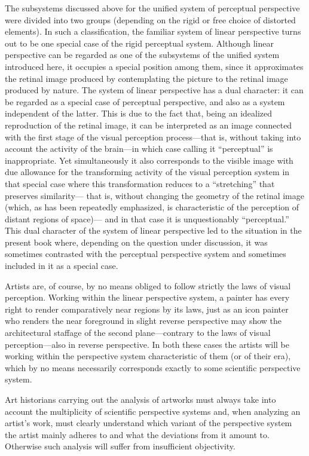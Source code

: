 The subsystems discussed above for the unified system of perceptual perspective were
divided into two groups (depending on the rigid or free choice of distorted elements).
In such a classification, the familiar system of linear perspective turns out to be one
special case of the rigid perceptual system.  Although linear perspective can be regarded
as one of the subsystems of the unified system introduced here, it occupies a special
position among them, since it approximates the retinal image produced by contemplating
the picture to the retinal image produced by nature.  The system of linear perspective
has a dual character: it can be regarded as a special case of perceptual perspective, and
also as a system independent of the latter.  This is due to the fact that, being an
idealized reproduction of the retinal image, it can be interpreted as an image connected
with the first stage of the visual perception process---that is, without taking into
account the activity of the brain---in which case calling it ``perceptual'' is
inappropriate.  Yet simultaneously it also corresponds to the visible image with due
allowance for the transforming activity of the visual perception system in that special
case where this transformation reduces to a ``stretching'' that preserves similarity---
that is, without changing the geometry of the retinal image (which, as has been
repeatedly emphasized, is characteristic of the perception of distant regions of space)---
and in that case it is unquestionably ``perceptual.''  This dual character of the system
of linear perspective led to the situation in the present book where, depending on the
question under discussion, it was sometimes contrasted with the perceptual perspective
system and sometimes included in it as a special case.

Artists are, of course, by no means obliged to follow strictly the laws of visual
perception.  Working within the linear perspective system, a painter has every right to
render comparatively near regions by its laws, just as an icon painter who renders the
near foreground in slight reverse perspective may show the architectural staffage of the
second plane---contrary to the laws of visual perception---also in reverse perspective.
In both these cases the artists will be working within the perspective system characteristic
of them (or of their era), which by no means necessarily corresponds exactly to some
scientific perspective system.

Art historians carrying out the analysis of artworks must always take into account the
multiplicity of scientific perspective systems and, when analyzing an artist's work, must
clearly understand which variant of the perspective system the artist mainly adheres to
and what the deviations from it amount to.  Otherwise such analysis will suffer from
insufficient objectivity.

